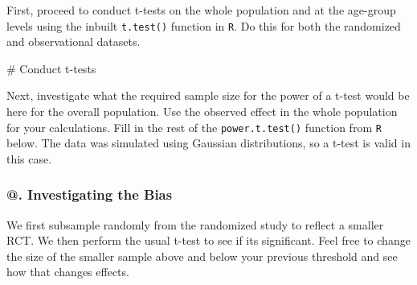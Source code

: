 \documentclass[
  letterpaper,
  DIV=11,
  numbers=noendperiod]{scrartcl}
\newenvironment{Shaded}{\begin{snugshade}}{\end{snugshade}}
\newcommand{\AttributeTok}[1]{\textcolor[rgb]{0.40,0.45,0.13}{#1}}
\newcommand{\CommentTok}[1]{\textcolor[rgb]{0.37,0.37,0.37}{#1}}
\newcommand{\FloatTok}[1]{\textcolor[rgb]{0.68,0.00,0.00}{#1}}
\newcommand{\FunctionTok}[1]{\textcolor[rgb]{0.28,0.35,0.67}{#1}}
\newcommand{\NormalTok}[1]{\textcolor[rgb]{0.00,0.23,0.31}{#1}}
\newcommand{\StringTok}[1]{\textcolor[rgb]{0.13,0.47,0.30}{#1}}
\begin{document}
First, proceed to conduct t-tests on the whole population and at the
age-group levels using the inbuilt \texttt{t.test()} function in
\texttt{R}. Do this for both the randomized and observational datasets.

\begin{Shaded}
\begin{Highlighting}[]
\CommentTok{\# Conduct t{-}tests}
\end{Highlighting}
\end{Shaded}

Next, investigate what the required sample size for the power of a
t-test would be here for the overall population. Use the observed effect
in the whole population for your calculations. Fill in the rest of the
\texttt{power.t.test()} function from \texttt{R} below. The data was
simulated using Gaussian distributions, so a t-test is valid in this
case.

\begin{Shaded}
\end{Shaded}

\subsubsection{@. Investigating the Bias}\label{investigating-the-bias}

We first subsample randomly from the randomized study to reflect a
smaller RCT. We then perform the usual t-test to see if its significant.
Feel free to change the size of the smaller sample above and below your
previous threshold and see how that changes effects.
\end{document}
